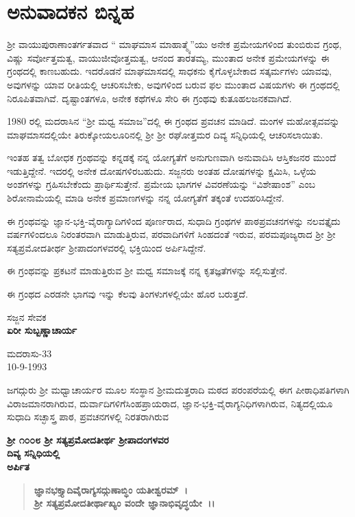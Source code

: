
\chapter*{ಅನುವಾದಕನ ಬಿನ್ನಹ}

 ಶ‍್ರೀ ವಾಯುಪುರಾಣಾಂತರ್ಗತವಾದ “ ಮಾಘಮಾಸ ಮಾಹಾತ್ಮ್ಯೆ”ಯು ಅನೇಕ ಪ್ರಮೇಯಗಳಿಂದ ತುಂಬಿರುವ ಗ್ರಂಥ, ವಿಷ್ಣು ಸರ್ವೋತ್ತಮತ್ವ, ವಾಯುಜೀವೋತ್ತಮತ್ವ, ಆನಂದ ತಾರತಮ್ಯ, ಮುಂತಾದ ಅನೇಕ ಪ್ರಮೇಯಗಳನ್ನು ಈ ಗ್ರಂಥದಲ್ಲಿ ಕಾಣಬಹುದು. ಇದರೊಡನೆ ಮಾಘಮಾಸದಲ್ಲಿ ಸಾಧಕನು ಕೈಗೊಳ್ಳಬೇಕಾದ ಸತ್ಕರ್ಮಗಳು ಯಾವವು, ಅವುಗಳನ್ನು ಯಾವ ರೀತಿಯಲ್ಲಿ ಆಚರಿಸಬೇಕು, ಅವುಗಳಿಂದ ಬರುವ ಫಲ ಮುಂತಾದ ವಿಷಯಗಳು ಈ ಗ್ರಂಥದಲ್ಲಿ ನಿರೂಪಿತವಾಗಿವೆ. ದೃಷ್ಟಾಂತಗಳೂ, ಅನೇಕ ಕಥೆಗಳೂ ಸೇರಿ ಈ ಗ್ರಂಥವು ಕುತೂಹಲಜನಕವಾಗಿದೆ.

1980 ರಲ್ಲಿ ಮದರಾಸಿನ “ಶ‍್ರೀ ಮಧ್ವ ಸಮಾಜ”ದಲ್ಲಿ ಈ ಗ್ರಂಥದ ಪ್ರವಚನ ಮಾಡಿದೆ. ಮಂಗಳ ಮಹೋತ್ಸವವನ್ನು ಮಾಘಮಾಸದಲ್ಲಿಯೇ ತಿರುಕ್ಕೋಯಲೂರಿನಲ್ಲಿ ಶ‍್ರೀ ಶ‍್ರೀ ರಘೋತ್ತಮರ ದಿವ್ಯ ಸನ್ನಿಧಿಯಲ್ಲಿ ಆಚರಿಸಲಾಯಿತು.

ಇಂತಹ ತತ್ವ ಬೋಧಕ ಗ್ರಂಥವನ್ನು ಕನ್ನಡಕ್ಕೆ ನನ್ನ ಯೋಗ್ಯತೆಗೆ ಅನುಗುಣವಾಗಿ ಅನುವಾದಿಸಿ ಆಸ್ತಿಕಜನರ ಮುಂದೆ ಇಡುತ್ತಿದ್ದೇನೆ. ಇದರಲ್ಲಿ ಅನೇಕ ದೋಷಗಳಿರಬಹುದು. ಸಜ್ಜನರು ಅಂತಹ ದೋಷಗಳನ್ನು ಕ್ಷಮಿಸಿ, ಒಳ್ಳೆಯ ಅಂಶಗಳನ್ನು ಗ್ರಹಿಸಬೇಕೆಂದು ಪ್ರಾರ್ಥಿಸು\-ತ್ತೇನೆ. ಪ್ರಮೇಯ ಭಾಗಗಳ ವಿವರಣೆಯನ್ನು “ವಿಶೇಷಾಂಶ” ಎಂಬ ಶಿರೋನಾಮೆಯಲ್ಲಿ ಮಾಡಿ ಅನೇಕ ಪ್ರಮಾಣಗಳನ್ನು ನನ್ನ ಯೋಗ್ಯತೆಗೆ ತಕ್ಕಂತೆ ಉದಹರಿಸಿದ್ದೇನೆ.

ಈ ಗ್ರಂಥವನ್ನು ಜ್ಞಾನ-ಭಕ್ತಿ-ವೈರಾಗ್ಯಾದಿಗಳಿಂದ ಪೂರ್ಣರಾದ, ಸುಧಾದಿ ಗ್ರಂಥಗಳ ಪಾಠಪ್ರವಚನಗಳನ್ನು ನಲವತ್ತೈದು ವರ್ಷಗಳಿಂದಲೂ ನಿರಂತರವಾಗಿ ಮಾಡುತ್ತಿರುವ, ಪರವಾದಿಗಳಿಗೆ ಸಿಂಹದಂತೆ ಇರುವ, ಪರಮಪೂಜ್ಯರಾದ ಶ‍್ರೀ ಶ‍್ರೀ ಸತ್ಯಪ್ರಮೋದತೀರ್ಥ ಶ‍್ರೀಪಾದಂಗಳವರಲ್ಲಿ ಭಕ್ತಿಯಿಂದ ಅರ್ಪಿಸಿದ್ದೇನೆ.

\newpage

ಈ ಗ್ರಂಥವನ್ನು ಪ್ರಕಟನೆ ಮಾಡುತ್ತಿರುವ ಶ‍್ರೀ ಮಧ್ವ ಸಮಾಜಕ್ಕೆ ನನ್ನ ಕೃತಜ್ಞತೆಗಳನ್ನು ಸಲ್ಲಿಸುತ್ತೇನೆ.

ಈ ಗ್ರಂಥದ ಎರಡನೇ ಭಾಗವು ಇನ್ನು ಕೆಲವು ತಿಂಗಳುಗಳಲ್ಲಿಯೇ ಹೊರ ಬರುತ್ತದೆ.

\begin{flushright}
ಸಜ್ಜನ ಸೇವಕ \\\textbf{ ಏರೀ ಸುಬ್ಬಣ್ಣಾಚಾರ್ಯ}
\end{flushright}

\begin{flushleft}
ಮದರಾಸು-33 \\ 10-9-1993
\end{flushleft}

\newpage

\begin{center}
\end{center}

ಜಗದ್ಗುರು ಶ‍್ರೀ ಮಧ್ವಾಚಾರ್ಯರ ಮೂಲ ಸಂಸ್ಥಾನ ಶ‍್ರೀಮದುತ್ತರಾದಿ ಮಠದ ಪರಂಪರೆಯಲ್ಲಿ ಈಗ ಪೀಠಾಧಿಪತಿಗಳಾಗಿ ವಿರಾಜಮಾನರಾಗಿರುವ, ದುರ್ವಾದಿಗಳಿಗೆ\break ಸಿಂಹಪ್ರಾಯರಾದ, ಜ್ಞಾನ-ಭಕ್ತಿ-ವೈರಾಗ್ಯನಿಧಿಗಳಾಗಿರುವ, ನಿತ್ಯದಲ್ಲಿಯೂ ಸುಧಾದಿ ಸಚ್ಛಾಸ್ತ್ರ ಪಾಠ, ಪ್ರವಚನಗಳಲ್ಲಿ ನಿರತರಾಗಿರುವ

\begin{center}
\textbf{ಶ‍್ರೀ ೧೦೦೮ ಶ‍್ರೀ ಸತ್ಯಪ್ರಮೋದತೀರ್ಥ ಶ‍್ರೀಪಾದಂಗಳವರ} \\\textbf{ದಿವ್ಯ ಸನ್ನಿಧಿಯಲ್ಲಿ} \\\textbf{ಅರ್ಪಿತ} 
\end{center}

\begin{verse}
\textbf{ಜ್ಞಾನಭಕ್ತ್ಯಾದಿವೈರಾಗ್ಯಸದ್ಗುಣಾಬ್ಧಿಂ ಯತೀಶ್ವರಮ್~।}\\\textbf{ಶ‍್ರೀ ಸತ್ಯಪ್ರಮೋದತೀರ್ಥಾಖ್ಯಂ ವಂದೇ ಜ್ಞಾನಾಭಿವೃದ್ಧಯೇ~।।}
\end{verse}

\emptypage

